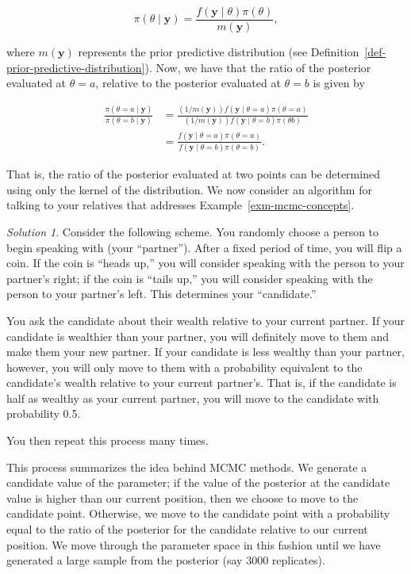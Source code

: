 \documentclass[
  letterpaper,
  DIV=11,
  numbers=noendperiod]{scrreprt}
\theoremstyle{definition}
\theoremstyle{definition}
\theoremstyle{plain}
\theoremstyle{remark}
\newtheorem*{solution}{Solution}
\begin{document}
\[\pi(\theta \mid \mathbf{y}) = \frac{f(\mathbf{y} \mid \theta) \pi(\theta)}{m(\mathbf{y})},\]

where \(m(\mathbf{y})\) represents the prior predictive distribution
(see Definition~\ref{def-prior-predictive-distribution}). Now, we have
that the ratio of the posterior evaluated at \(\theta = a\), relative to
the posterior evaluated at \(\theta = b\) is given by

\[
\begin{aligned}
  \frac{\pi(\theta = a \mid \mathbf{y})}{\pi(\theta = b \mid \mathbf{y})} 
    &= \frac{(1/m(\mathbf{y})) f(\mathbf{y} \mid \theta = a) \pi(\theta = a)}{(1/m(\mathbf{y})) f(\mathbf{y} \mid \theta = b)\pi(\theta b)} \\
    &= \frac{f(\mathbf{y} \mid \theta = a) \pi(\theta = a)}{f(\mathbf{y} \mid \theta = b)\pi(\theta = b)}.
\end{aligned}
\]

That is, the ratio of the posterior evaluated at two points can be
determined using only the kernel of the distribution. We now consider an
algorithm for talking to your relatives that addresses
Example~\ref{exm-mcmc-concepts}.

\begin{solution}

Consider the following scheme. You randomly choose a person to begin
speaking with (your ``partner''). After a fixed period of time, you will
flip a coin. If the coin is ``heads up,'' you will consider speaking
with the person to your partner's right; if the coin is ``tails up,''
you will consider speaking with the person to your partner's left. This
determines your ``candidate.''

You ask the candidate about their wealth relative to your current
partner. If your candidate is wealthier than your partner, you will
definitely move to them and make them your new partner. If your
candidate is less wealthy than your partner, however, you will only move
to them with a probability equivalent to the candidate's wealth relative
to your current partner's. That is, if the candidate is half as wealthy
as your current partner, you will move to the candidate with probability
0.5.

You then repeat this process many times.

\end{solution}

This process summarizes the idea behind MCMC methods. We generate a
candidate value of the parameter; if the value of the posterior at the
candidate value is higher than our current position, then we choose to
move to the candidate point. Otherwise, we move to the candidate point
with a probability equal to the ratio of the posterior for the candidate
relative to our current position. We move through the parameter space in
this fashion until we have generated a large sample from the posterior
(say 3000 replicates).
\end{document}
